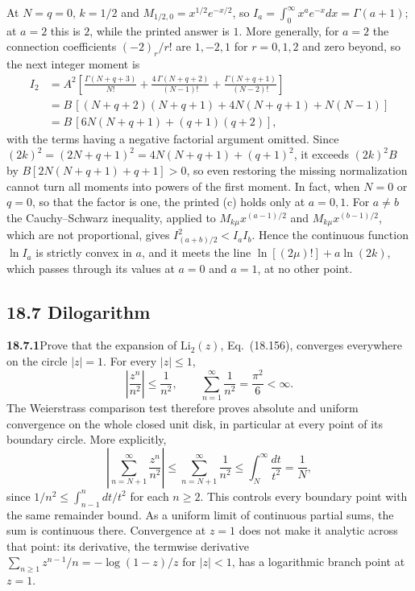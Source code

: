 At $N=q=0$, $k=1/2$ and $M_{1/2,0}=x^{1/2}e^{-x/2}$,
so $I_a=\int_0^\infty x^ae^{-x}dx=\Gamma(a+1)$; at $a=2$ this is
$2$, while the printed answer is $1$.  More generally, for $a=2$ the
connection coefficients $(-2)_r/r!$ are $1,-2,1$ for $r=0,1,2$
and zero beyond, so the next integer moment is
\begin{align*}
I_2&=A^2\left[\frac{\Gamma(N+q+3)}{N!}
 +\frac{4\,\Gamma(N+q+2)}{(N-1)!}
 +\frac{\Gamma(N+q+1)}{(N-2)!}\right]\\
 &=B\,[(N+q+2)(N+q+1)+4N(N+q+1)+N(N-1)]\\
 &=B\,[6N(N+q+1)+(q+1)(q+2)],
\end{align*}
with the terms having a negative factorial argument omitted.
Since $(2k)^2=(2N+q+1)^2=4N(N+q+1)+(q+1)^2$, it exceeds
$(2k)^2B$ by
$B[2N(N+q+1)+q+1]>0$, so even restoring the missing normalization
cannot turn all moments into powers of the first moment.
In fact, when $N=0$ or $q=0$, so that the factor is one, the
printed (c) holds only at $a=0,1$.  For $a\ne b$ the
Cauchy--Schwarz inequality, applied to $M_{k\mu}x^{(a-1)/2}$ and
$M_{k\mu}x^{(b-1)/2}$, which are not proportional, gives
$I_{(a+b)/2}^2<I_aI_b$.  Hence the continuous function $\ln I_a$ is
strictly convex in $a$, and it meets the line
$\ln[(2\mu)!]+a\ln(2k)$, which passes through its values at $a=0$
and $a=1$, at no other point.

\subsection*{18.7 Dilogarithm}

\par\bigskip
\noindent\textbf{18.7.1}\quad Prove that the expansion of
$\mathrm{Li}_{2}(z)$, Eq.~(18.156), converges everywhere on the
circle $|z| = 1$.
\solution
For every $|z|\le1$,
\[
\left|\frac{z^n}{n^2}\right|\le\frac1{n^2},\qquad
\sum_{n=1}^\infty\frac1{n^2}=\frac{\pi^2}{6}<\infty.
\]
The Weierstrass comparison test therefore proves absolute and
uniform convergence on the whole closed unit disk, in particular
at every point of its boundary circle.  More explicitly,
\[
\left|\sum_{n=N+1}^\infty\frac{z^n}{n^2}\right|
 \le\sum_{n=N+1}^\infty\frac1{n^2}
 \le\int_N^\infty\frac{dt}{t^2}=\frac1N,
\]
since $1/n^2\le\int_{n-1}^n dt/t^2$ for each $n\ge2$.
This controls every boundary point with the same remainder bound.
As a uniform limit of continuous partial sums, the sum is
continuous there.  Convergence at $z=1$ does not
make it analytic across that point: its derivative, the termwise
derivative $\sum_{n\ge1}z^{n-1}/n=-\log(1-z)/z$ for $|z|<1$, has a
logarithmic branch point at $z=1$.

